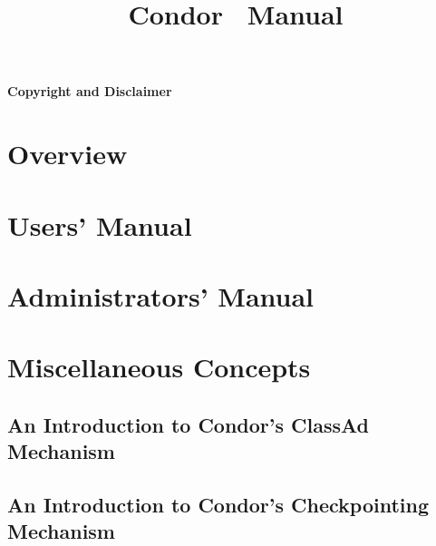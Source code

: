 \documentclass[titlepage,oneside]{book}
\begin{document}
\title{Condor \VersionNotice\ Manual}
\author{\AuthorNotice}
\maketitle


\tableofcontents

\sloppy
\begin{small}
\subsubsection{Copyright and Disclaimer}
\label{sec:copyright-and-disclaimer}

\end{small}

\newpage
{}

\chapter{Overview}
\label{overview}


\chapter{Users' Manual}
\label{user-manual}


\chapter{Administrators' Manual}
\label{admin-manual}



\chapter{Miscellaneous Concepts}
\section{\label{classad-reference}
An Introduction to Condor's ClassAd Mechanism}

\section{\label{ckpt-reference}
An Introduction to Condor's Checkpointing Mechanism}


\end{document}
